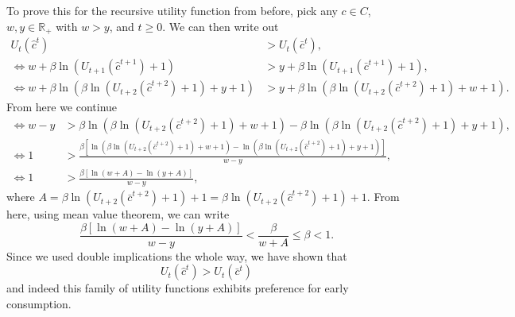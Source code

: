 \documentclass[11pt,english]{article}
\begin{document}
\begin{enumerate}[label = (\alph*)]
\begin{solution}
To prove this for the recursive utility function from before, pick any $c\in C$, $w,y\in \mathbb{R}_+$ with $w > y$, and $t \geq 0$. We can then write out
\begin{align*}
U_t(\hat{c}^t) &> U_t(\bar{c}^t),\\
\Longleftrightarrow w + \beta\ln(U_{t+1}(\hat{c}^{t+1}) +1) &> y + \beta\ln(U_{t+1}(\bar{c}^{t+1}) +1),\\
\Longleftrightarrow w + \beta\ln(\beta\ln(U_{t+2}(\hat{c}^{t+2}) + 1) + y +1)  &> y + \beta\ln(\beta\ln(U_{t+2}(\bar{c}^{t+2}) + 1) + w +1).
\end{align*}
From here we continue
\begin{align*}
\Longleftrightarrow w - y &> \beta\ln(\beta\ln(U_{t+2}(\bar{c}^{t+2}) + 1) + w +1) - \beta\ln(\beta\ln(U_{t+2}(\hat{c}^{t+2}) + 1) + y +1),\\
\Longleftrightarrow 1&> \frac{\beta\left[\ln(\beta\ln(U_{t+2}(\bar{c}^{t+2}) + 1) + w +1) - \ln(\beta\ln(U_{t+2}(\hat{c}^{t+2}) + 1) + y +1)\right]}{w - y},\\
\Longleftrightarrow 1&> \frac{\beta\left[\ln(w +A) - \ln(y +A)\right]}{w - y},
\end{align*}where $A = \beta\ln(U_{t+2}(\bar{c}^{t+2}) + 1) + 1 = \beta\ln(U_{t+2}(\hat{c}^{t+2}) + 1) + 1$. From here, using mean value theorem, we can write $$\frac{\beta\left[\ln(w +A) - \ln(y +A)\right]}{w - y} < \frac{\beta}{w + A} \leq \beta < 1.$$ Since we used double implications the whole way, we have shown that $$U_t(\hat{c}^t) > U_t(\bar{c}^t)$$ and indeed this family of utility functions exhibits preference for early consumption.


\end{solution}
\end{enumerate}
\end{document}
